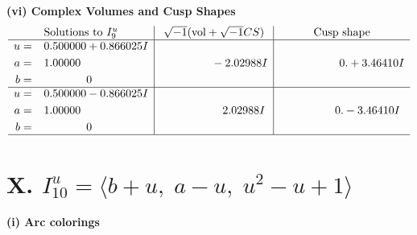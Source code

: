 \documentclass[1p]{elsarticle_modified}
\theoremstyle{definition}
\newcommand{\I}{\sqrt{-1}}
\begin{document}
\newpage\flushleft \textbf{(vi) Complex Volumes and Cusp Shapes}
$$\begin{array}{c|c|c}  
\text{Solutions to }I^u_{9}& \I (\text{vol} + \sqrt{-1}CS) & \text{Cusp shape}\\
 \hline 
\begin{aligned}
u &= \phantom{-}0.500000 + 0.866025 I \\
a &= \phantom{-}1.00000\phantom{ +0.000000I} \\
b &= \phantom{-0.000000 } 0\end{aligned}
 & \phantom{-0.000000 } -2.02988 I & \phantom{-0.000000 -}0. + 3.46410 I \\ \hline\begin{aligned}
u &= \phantom{-}0.500000 - 0.866025 I \\
a &= \phantom{-}1.00000\phantom{ +0.000000I} \\
b &= \phantom{-0.000000 } 0\end{aligned}
 & \phantom{-0.000000 -}2.02988 I & \phantom{-0.000000 } 0. - 3.46410 I\\
 \hline 
 \end{array}$$\newpage\newpage\renewcommand{\arraystretch}{1}
\centering \section*{X. $I^u_{10}= \langle b+u,\;a- u,\;u^2- u+1 \rangle$}
\flushleft \textbf{(i) Arc colorings}\\
\end{document}
